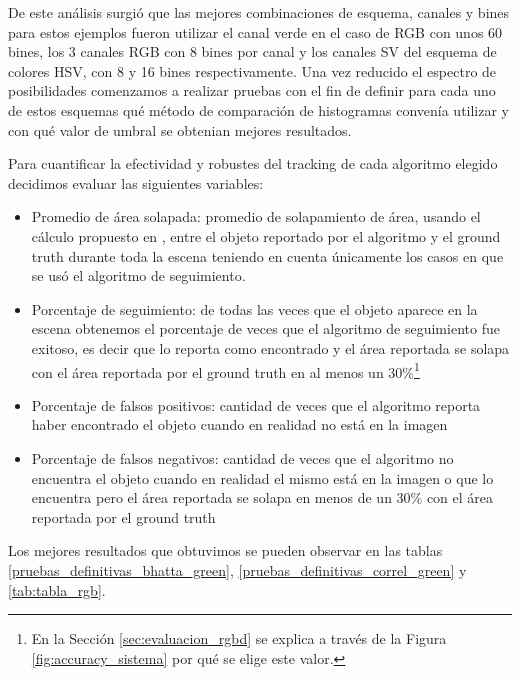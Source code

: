 De este análisis surgió que las mejores combinaciones de esquema, canales y bines para estos ejemplos fueron utilizar el canal verde en el caso de RGB con unos 60 bines, los 3 canales RGB con 8 bines por canal y los canales SV del esquema de colores HSV, con 8 y 16 bines respectivamente. Una vez reducido el espectro de posibilidades comenzamos a realizar pruebas con el fin de definir para cada uno de estos esquemas qué método de comparación de histogramas convenía utilizar y con qué valor de umbral se obtenian mejores resultados.

Para cuantificar la efectividad y robustes del tracking de cada algoritmo elegido decidimos evaluar las siguientes variables:
\begin{itemize}
	\item Promedio de área solapada: promedio de solapamiento de área, usando el cálculo propuesto en \cite{everinghampascal}, entre el objeto reportado por el algoritmo y el ground truth durante toda la escena teniendo en cuenta únicamente los casos en que se usó el algoritmo de seguimiento.
	\item Porcentaje de seguimiento: de todas las veces que el objeto aparece en la escena obtenemos el porcentaje de veces que el algoritmo de seguimiento fue exitoso, es decir que lo reporta como encontrado y el área reportada se solapa con el área reportada por el ground truth en al menos un 30\%\footnote{En la Sección \ref{sec:evaluacion_rgbd} se explica a través de la Figura \ref{fig:accuracy_sistema} por qué se elige este valor.}
	\item Porcentaje de falsos positivos: cantidad de veces que el algoritmo reporta haber encontrado el objeto cuando en realidad no está en la imagen
	\item Porcentaje de falsos negativos: cantidad de veces que el algoritmo no encuentra el objeto cuando en realidad el mismo está en la imagen o que lo encuentra pero el área reportada se solapa en menos de un 30\% con el área reportada por el ground truth
\end{itemize}

Los mejores resultados que obtuvimos se pueden observar en las tablas \ref{pruebas_definitivas_bhatta_green}, \ref{pruebas_definitivas_correl_green} y \ref{tab:tabla_rgb}.

